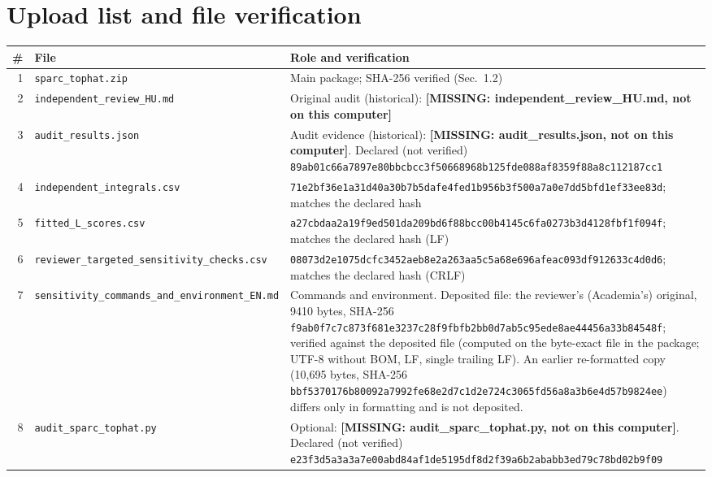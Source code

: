 \documentclass[10pt,a4paper]{article}
\newcommand{\missing}[1]{\textcolor{red!70!black}{\textbf{[MISSING: #1]}}}
\begin{document}
\section{Upload list and file verification}\label{sec:upload}
{\footnotesize\begin{tabularx}{\textwidth}{@{}rlL@{}}\toprule
\# & File & Role and verification\\ & \texttt{sparc\_tophat.zip} & Main package; SHA-256 verified (Sec.~1.2)\\
2 & \texttt{independent\_review\_HU.md} & Original audit (historical): \missing{independent\_review\_HU.md, not on this computer}\\
3 & \texttt{audit\_results.json} & Audit evidence (historical): \missing{audit\_results.json, not on this computer}. Declared (not verified) {\scriptsize\texttt{89ab01c66a7897e80bbcbcc3f50668968b125fde088af8359f88a8c112187cc1}}\\
4 & \texttt{independent\_integrals.csv} & {\scriptsize\texttt{71e2bf36e1a31d40a30b7b5dafe4fed1b956b3f500a7a0e7dd5bfd1ef33ee83d}}; matches the declared hash\\
5 & \texttt{fitted\_L\_scores.csv} & {\scriptsize\texttt{a27cbdaa2a19f9ed501da209bd6f88bcc00b4145c6fa0273b3d4128fbf1f094f}}; matches the declared hash (LF)\\
6 & \texttt{reviewer\_targeted\_sensitivity\_checks.csv} & {\scriptsize\texttt{08073d2e1075dcfc3452aeb8e2a263aa5c5a68e696afeac093df912633c4d0d6}}; matches the declared hash (CRLF)\\
7 & \texttt{sensitivity\_commands\_and\_environment\_EN.md} & Commands and environment. Deposited file: the reviewer's (Academia's) original, 9410 bytes, SHA-256 {\scriptsize\texttt{f9ab0f7c7c873f681e3237c28f9fbfb2bb0d7ab5c95ede8ae44456a33b84548f}}; verified against the deposited file (computed on the byte-exact file in the package; UTF-8 without BOM, LF, single trailing LF). An earlier re-formatted copy (10,695 bytes, SHA-256 {\scriptsize\texttt{bbf5370176b80092a7992fe68e2d7c1d2e724c3065fd56a8a3b6e4d57b9824ee}}) differs only in formatting and is not deposited.\\
8 & \texttt{audit\_sparc\_tophat.py} & Optional: \missing{audit\_sparc\_tophat.py, not on this computer}. Declared (not verified) {\scriptsize\texttt{e23f3d5a3a3a7e00abd84af1de5195df8d2f39a6b2ababb3ed79c78bd02b9f09}}\\\bottomrule
\end{tabularx}}
\end{document}
